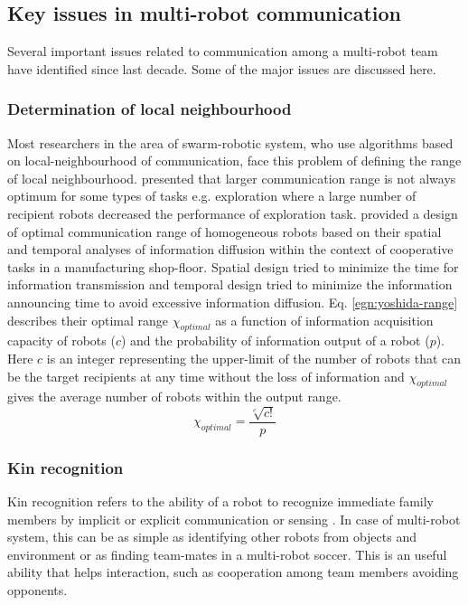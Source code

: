 \subsection{Key issues in multi-robot communication}
\label{bg:mrs-comm:key-issues}
Several important issues related to communication among a multi-robot team have identified since last decade. Some of the major issues are discussed here.
\subsubsection*{Determination of local neighbourhood}
Most researchers in the area of swarm-robotic system, who use algorithms based on local-neighbourhood of communication, face this problem of defining the range of local neighbourhood.  presented that larger communication range is not always optimum for some types of tasks e.g. exploration where a large number of recipient robots decreased the performance of exploration task.  provided a design of optimal communication range of homogeneous robots based on their spatial and temporal analyses of information diffusion within the context of cooperative tasks in a manufacturing shop-floor. Spatial design tried to minimize the time for information transmission and temporal design tried to minimize the information announcing time to avoid excessive information diffusion. Eq. \ref{egn:yoshida-range} describes their optimal range $\chi_{optimal}$ as a function of information acquisition capacity of robots ($c$) and the probability of information output of a robot ($p$). Here $c$ is an integer representing the upper-limit of the number of robots that can be the target recipients at any time without the loss of information and $\chi_{optimal}$ gives the average number of robots within the output range.
\begin{equation}
\chi_{optimal} = \frac{\sqrt [c] {c!}}{p}
\label{egn:yoshida-range}
\end{equation}
\subsubsection*{Kin recognition}
Kin recognition refers to the ability of a robot to recognize immediate family members by implicit or explicit communication or sensing \cite{Mataric2007}. In case of multi-robot system, this can be as simple as identifying other robots from objects and environment or as finding team-mates in a multi-robot soccer. This is an useful ability that helps interaction, such as cooperation among team members avoiding opponents. 
